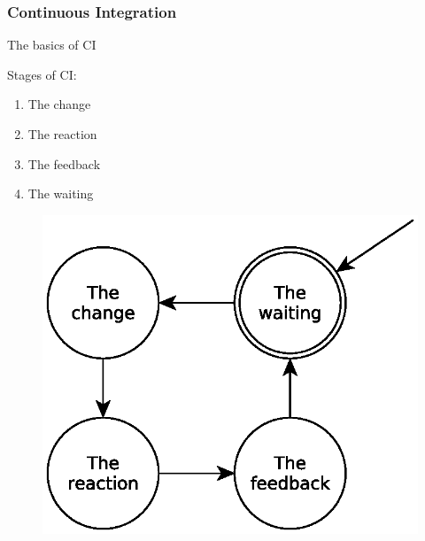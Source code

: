 \documentclass[10pt,xcolor=pdflatex]{beamer}
\begin{document}
\begin{frame}\frametitle{Continuous Integration}
	\begin{centering}
		\large{The basics of CI}\\[1em]
	\end{centering}
	\begin{multicols}{2}
		Stages of CI:
		\begin{enumerate}
			\item The change
			\item The reaction
			\item The feedback
			\item The waiting 
		\end{enumerate}
		\begin{figure}[H]
			\centering
			\includegraphics[scale=0.5]{eps/stages_of_ci.eps}
		\end{figure}
	\end{multicols}
\end{frame}
\end{document}
